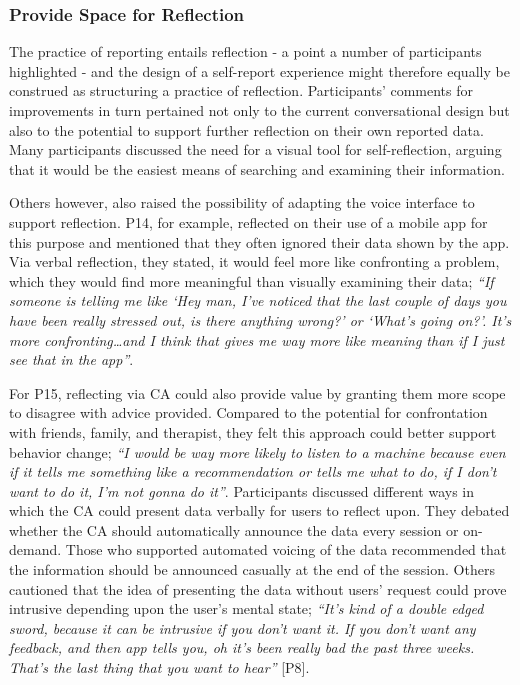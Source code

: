         \subsubsection{Provide Space for Reflection}
        
            The practice of reporting entails reflection - a point a number of participants highlighted - and the design of a self-report experience might therefore equally be construed as structuring a practice of reflection. Participants' comments for improvements in turn pertained not only to the current conversational design but also to the potential to support further reflection on their own reported data. Many participants discussed the need for a visual tool for self-reflection, arguing that it would be the easiest means of searching and examining their information.
                   
            Others however, also raised the possibility of adapting the voice interface to support reflection. P14, for example, reflected on their use of a mobile app for this purpose and mentioned that they often ignored their data shown by the app. Via verbal reflection, they stated, it would feel more like confronting a problem, which they would find more meaningful than visually examining their data; \textit{``If someone is telling me like `Hey man, I've noticed that the last couple of days you have been really stressed out, is there anything wrong?' or `What's going on?'. It's more confronting\ldots and I think that gives me way more like meaning than if I just see that in the app''}.
            
            For P15, reflecting via \ac{CA} could also provide value by granting them more scope to disagree with advice provided. Compared to the potential for confrontation with friends, family, and therapist, they felt this approach could better support behavior change; \textit{``I would be way more likely to listen to a machine because even if it tells me something like a recommendation or tells me what to do, if I don't want to do it, I'm not gonna do it''}. Participants discussed different ways in which the \ac{CA} could present data verbally for users to reflect upon. They debated whether the \ac{CA} should automatically announce the data every session or on-demand. Those who supported automated voicing of the data recommended that the information should be announced casually at the end of the session. Others cautioned that the idea of presenting the data without users' request could prove intrusive depending upon the user's mental state; \textit{``It's kind of a double edged sword, because it can be intrusive if you don't want it. If you don't want any feedback, and then \acl{app} tells you, oh it's been really bad the past three weeks. That's the last thing that you want to hear''} [P8].
          





